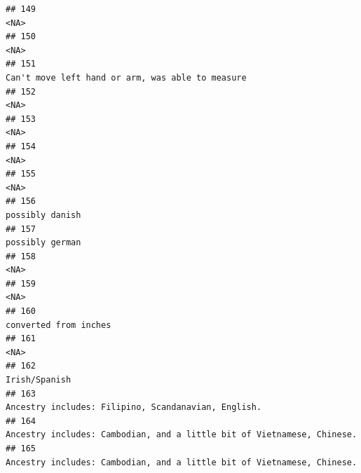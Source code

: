 \documentclass[]{article}
\begin{document}
\begin{verbatim}
## 149                                                                                                                                                <NA>
## 150                                                                                                                                                <NA>
## 151                                                                                                    Can't move left hand or arm, was able to measure
## 152                                                                                                                                                <NA>
## 153                                                                                                                                                <NA>
## 154                                                                                                                                                <NA>
## 155                                                                                                                                                <NA>
## 156                                                                                                                                     possibly danish
## 157                                                                                                                                     possibly german
## 158                                                                                                                                                <NA>
## 159                                                                                                                                                <NA>
## 160                                                                                                                               converted from inches
## 161                                                                                                                                                <NA>
## 162                                                                                                                                       Irish/Spanish
## 163                                                                                                 Ancestry includes: Filipino, Scandanavian, English.
## 164                                                                              Ancestry includes: Cambodian, and a little bit of Vietnamese, Chinese.
## 165                                                                              Ancestry includes: Cambodian, and a little bit of Vietnamese, Chinese.

\end{verbatim}
\end{document}
